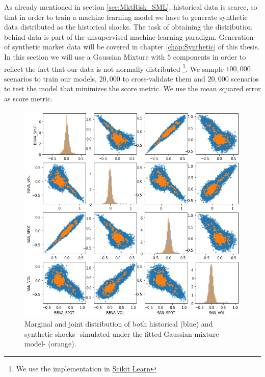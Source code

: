 As already mentioned in section \ref{sec:MktRisk_SML}, historical data is scarce, so that in order to train a machine learning model we have to generate synthetic data distributed as the historical shocks. The task of obtaining the distribution behind data is part of the unsupervised machine learning paradigm. Generation of synthetic market data will be covered in chapter \ref{chap:Synthetic} of this thesis. In this section we will use a Gaussian Mixture with $5$ components in order to reflect the fact that our data is not normally distributed \footnote{We use the implementation in \href{https://scikit-learn.org/stable/modules/generated/sklearn.mixture.GaussianMixture.html}{Scikit Learn}}. We sample $100,000$ scenarios to train our models, $20,000$ to cross-validate them and $20,000$ scenarios to test the model that minimizes the score metric. We use the mean squared error as score metric.

 \jorge{$\checkmark$}

\begin{figure}[H] 
\centering
\includegraphics[width=1.0\textwidth]{Figures/MarketRisk/GaussMixture.png}
\caption{Marginal and joint distribution of both historical (blue) and synthetic shocks -simulated under the fitted Gaussian mixture model- (orange).}
\label{fig:distrib_P_simul}
\end{figure}
 \jorge{$\checkmark$}


